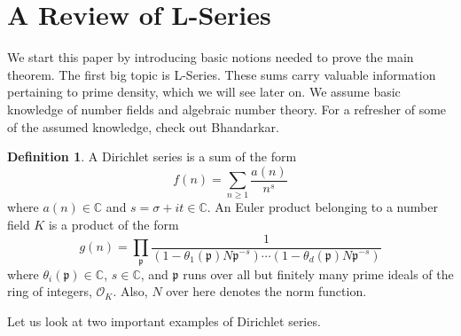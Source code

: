 \documentclass{article}
\newcommand{\CC}{\mathbb{C}}
\theoremstyle{plain}
\theoremstyle{definition}
\newtheorem{defn}[thm]{Definition}
\theoremstyle{remark}
\numberwithin{equation}{section}
\numberwithin{thm}{section}
\begin{document}
\begin{abstract}
By generalizing our arguments in the study of L-functions, we establish the theory needed to prove the main theorem in the case of an abelian extension $L \supset K$. At this point, we finally arrive at the main theorem, and prove it in the case of non-abelian extensions by cleverly connecting it to the abelian case. 

Finally, we come to what is arguably the most important section: applications of the Čebotarev Density Theorem. This theorem has prolific applications, ranging from the theory of binary quadratic forms to the first main theorem of complex multiplication, although we just list a few. We then part with some concluding remarks. 

\end{abstract}




\section{A Review of L-Series}

We start this paper by introducing basic notions needed to prove the main theorem. The first big topic is L-Series. These sums carry valuable information pertaining to prime density, which we will see later on. We assume basic knowledge of number fields and algebraic number theory. For a refresher of some of the assumed knowledge, check out Bhandarkar\cite{bhandarkar2018hilbert}.

\begin{defn}
A Dirichlet series is a sum of the form $$f(n) = \sum_{n \ge 1} \frac{a(n)}{n^s}$$ where $a(n) \in \CC$ and $s = \sigma + it \in \CC$. An Euler product belonging to a number field $K$ is a product of the form $$g(n) = \prod_{\mathfrak{p}} \frac{1}{(1-\theta_1(\mathfrak{p})N\mathfrak{p}^{-s}) \cdots (1-\theta_d(\mathfrak{p})N\mathfrak{p}^{-s})}$$ where $\theta_i(\mathfrak{p}) \in \CC$, $s \in \CC$, and $\mathfrak{p}$ runs over all but finitely many prime ideals of the ring of integers, $\mathcal{O}_K$. Also, $N$ over here denotes the norm function.  
\end{defn}

Let us look at two important examples of Dirichlet series. 
\end{document}
